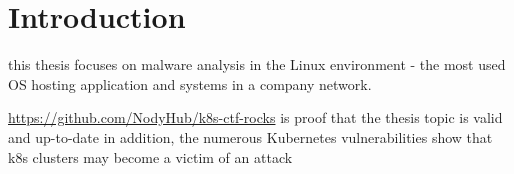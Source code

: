 \chapter{Introduction}

this thesis focuses on malware analysis in the Linux environment - the most used OS hosting application and systems in a company network.

\url{https://github.com/NodyHub/k8s-ctf-rocks} is proof that the thesis topic is valid and up-to-date
in addition, the numerous Kubernetes vulnerabilities show that k8s clusters may become a victim of an attack